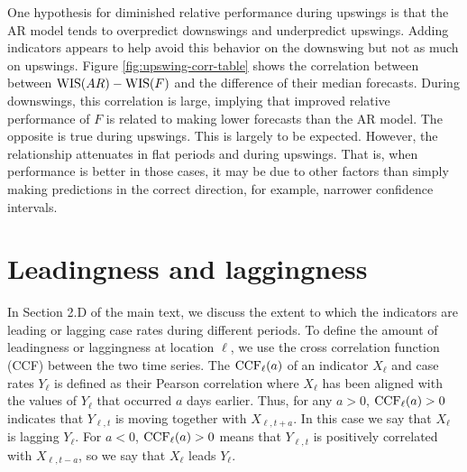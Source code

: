 One hypothesis for diminished relative performance during upswings is that 
the AR model tends to overpredict downswings and underpredict upswings. Adding
indicators appears to help avoid this behavior on the downswing but not as much 
on upswings. Figure \ref{fig:upswing-corr-table} shows the correlation between
between $\mathrm{WIS}(AR) - \mathrm{WIS}(F)$ and the difference of their median forecasts.
During 
downswings, this correlation is large, implying that improved relative
performance 
of $F$ is related to making lower forecasts than the AR model. The opposite is
true during upswings. This is largely to be expected. However, the relationship
attenuates in flat periods and during upswings. That is, when performance is
better 
in those cases, it may be due to other factors than simply making predictions
in the correct direction, for example, narrower confidence intervals.


\section{Leadingness and laggingness}

In Section 2.D of the main text, we discuss the extent to which the indicators
are leading or lagging case rates during different periods. To define the amount
of leadingness or laggingness at location $\ell$, we use the cross correlation
function (CCF) 
between the two time series. The $\mathrm{CCF}_\ell(a)$ of an indicator $X_{\ell}$ and case
rates $Y_{\ell}$ is defined as
their Pearson correlation where $X_\ell$ has been
aligned
with the values of $Y_{\ell}$ that occurred $a$ days earlier.
Thus, for any $a>0$, $\mathrm{CCF}_{\ell}(a)>0$ indicates that
$Y_{\ell,t}$ is moving together with $X_{\ell,t+a}$.
In this case we say that $X_{\ell}$ is lagging
$Y_{\ell}$. For $a<0$, $\mathrm{CCF}_{\ell}(a)>0$ means that $Y_{\ell,t}$ is
positively correlated with $X_{\ell,t-a}$, so we say that
$X_{\ell}$ leads $Y_{\ell}$.

